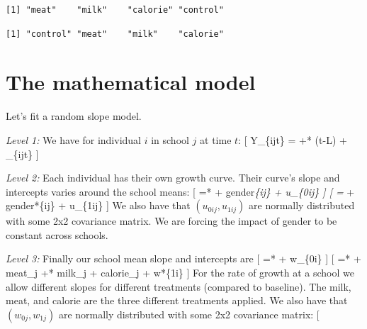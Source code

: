 \documentclass[
  letterpaper,
  DIV=11,
  numbers=noendperiod]{scrreprt}
\newenvironment{Shaded}{}{}
\newcommand{\AttributeTok}[1]{\textcolor[rgb]{0.49,0.56,0.16}{#1}}
\newcommand{\FunctionTok}[1]{\textcolor[rgb]{0.02,0.16,0.49}{#1}}
\newcommand{\NormalTok}[1]{#1}
\newcommand{\OtherTok}[1]{\textcolor[rgb]{0.00,0.44,0.13}{#1}}
\newcommand{\SpecialCharTok}[1]{\textcolor[rgb]{0.25,0.44,0.63}{#1}}
\newcommand{\StringTok}[1]{\textcolor[rgb]{0.25,0.44,0.63}{#1}}
\begin{document}
\begin{Shaded}
\end{Shaded}

\begin{verbatim}
[1] "meat"    "milk"    "calorie" "control"
\end{verbatim}

\begin{Shaded}
\end{Shaded}

\begin{verbatim}
[1] "control" "meat"    "milk"    "calorie"
\end{verbatim}

\section{The mathematical model}\label{the-mathematical-model-2}

Let's fit a random slope model.

\emph{Level 1:} We have for individual \(i\) in school \(j\) at time
\(t\): {[} Y\_\{ijt\} =  +*  (t-L) +
\epsilon\_\{ijt\} {]}

\emph{Level 2:} Each individual has their own growth curve. Their
curve's slope and intercepts varies around the school means: {[}
 =*  +  gender\emph{\{ij\} + u\_\{0ij\}
{]} {[}  =}  +  gender*\{ij\} +
u\_\{1ij\} {]} We also have that \((u_{0ij}, u_{1ij})\) are normally
distributed with some 2x2 covariance matrix. We are forcing the impact
of gender to be constant across schools.

\emph{Level 3:} Finally our school mean slope and intercepts are {[}
 =*  + w\_\{0i\} {]} {[}  =*  +
 meat\_j +*  milk\_j +  calorie\_j + w*\{1i\} {]}
For the rate of growth at a school we allow different slopes for
different treatments (compared to baseline). The milk, meat, and calorie
are the three different treatments applied. We also have that
\((w_{0j}, w_{1j})\) are normally distributed with some 2x2 covariance
matrix: {[}
\end{document}
